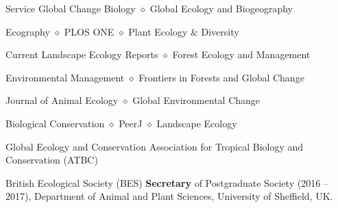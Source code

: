 
\begin{rubric}{Service}
    Global Change Biology $\diamond$ Global Ecology and Biogeography \par  Ecography $\diamond$ PLOS ONE $\diamond$ Plant Ecology \& Diversity \par Current Landscape Ecology Reports $\diamond$ Forest Ecology and Management \par Environmental Management  $\diamond$ Frontiers in Forests and Global Change \par Journal of Animal Ecology $\diamond$ Global Environmental Change \par Biological Conservation $\diamond$ PeerJ $\diamond$ Landscape Ecology \par Global Ecology and Conservation
	Association for Tropical Biology and Conservation (ATBC) 
	\par British Ecological Society (BES)
    \textbf{Secretary} of Postgraduate Society (2016 -- 2017), Department of Animal and Plant Sciences, University of Sheffield, UK.
\end{rubric}
